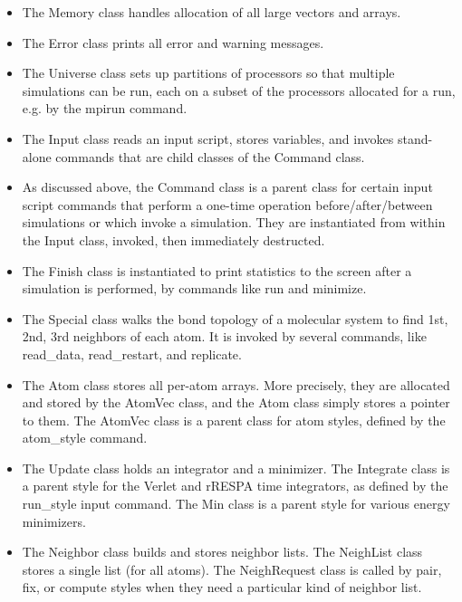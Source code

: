 \documentclass{article}
\begin{document}
\begin{itemize}

\item The Memory class handles allocation of all large vectors and
  arrays.

\item The Error class prints all error and warning messages.

\item The Universe class sets up partitions of processors so that
  multiple simulations can be run, each on a subset of the processors
  allocated for a run, e.g. by the mpirun command.

\item The Input class reads an input script, stores variables, and
  invokes stand-alone commands that are child classes of the Command
  class.

\item As discussed above, the Command class is a parent class for
  certain input script commands that perform a one-time operation
  before/after/between simulations or which invoke a simulation.  They
  are instantiated from within the Input class, invoked, then
  immediately destructed.

\item The Finish class is instantiated to print statistics to the
  screen after a simulation is performed, by commands like run and
  minimize.

\item The Special class walks the bond topology of a molecular system
  to find 1st, 2nd, 3rd neighbors of each atom.  It is invoked by
  several commands, like read\_data, read\_restart, and replicate.

\item The Atom class stores all per-atom arrays.  More precisely, they
  are allocated and stored by the AtomVec class, and the Atom class
  simply stores a pointer to them.  The AtomVec class is a parent
  class for atom styles, defined by the atom\_style command.

\item The Update class holds an integrator and a minimizer.  The
  Integrate class is a parent style for the Verlet and rRESPA time
  integrators, as defined by the run\_style input command.  The Min
  class is a parent style for various energy minimizers.

\item The Neighbor class builds and stores neighbor lists.  The
  NeighList class stores a single list (for all atoms).  The
  NeighRequest class is called by pair, fix, or compute styles when
  they need a particular kind of neighbor list.


\end{itemize}
\end{document}
